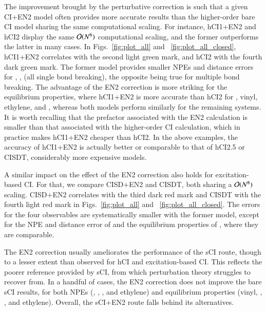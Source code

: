 \documentclass[aip,jcp,reprint,noshowkeys,superscriptaddress]{revtex4-1}
\newcommand{\Ndet}{N_\text{det}}
\begin{document}
The improvement brought by the perturbative correction is such that a given CI+EN2 model often provides more accurate results than the higher-order bare CI model sharing the same computational scaling.
For instance, hCI1+EN2 and hCI2 display the same $\order*{N^6}$ computational scaling, and the former outperforms the latter in many cases.
In Figs.~\ref{fig:plot_all} and ~\ref{fig:plot_all_closed}, hCI1+EN2 correlates with the second light green mark, and hCI2 with the fourth dark green mark.
The former model provides smaller NPEs and distance errors for , ,  (all single bond breaking),
the opposite being true for multiple bond breaking.
The advantage of the EN2 correction is more striking for the equilibrium properties,
where hCI1+EN2 is more accurate than hCI2 for , vinyl, ethylene, and ,
whereas both models perform similarly for the remaining systems.
It is worth recalling that the prefactor associated with the EN2 calculation is smaller than that associated with the higher-order CI calculation,
which in practice makes hCI1+EN2 cheaper than hCI2.
In the above examples, the accuracy of hCI1+EN2 is actually better or comparable to that of hCI2.5 or CISDT, considerably more expensive models.

A similar impact on the effect of the EN2 correction also holds for excitation-based CI.
For that, we compare CISD+EN2 and CISDT, both sharing a $\order*{N^8}$ scaling.
CISD+EN2 correlates with the third dark red mark and CISDT with the fourth light red mark in Figs.~\ref{fig:plot_all} and ~\ref{fig:plot_all_closed}.
The errors for the four observables are systematically smaller with the former model,
except for the NPE and distance error of  and the equilibrium properties of , where they are comparable.


The EN2 correction usually ameliorates the performance of the sCI route, though to a lesser extent than observed for hCI and excitation-based CI.
This reflects the poorer reference provided by sCI, from which perturbation theory struggles to recover from.
In a handful of cases, the EN2 correction does not improve the bare sCI results,
for both NPEs (, , , and ethylene)
and equilibrium properties (vinyl, , , and ethylene).
Overall, the sCI+EN2 route falls behind its alternatives.
\end{document}
